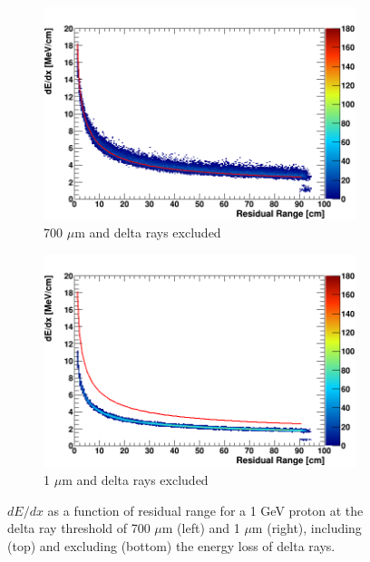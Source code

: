 \begin{figure}[t!]
\begin{subfigure}[b]{0.495\textwidth}
            \label{fig:derr_proton_delta_1}
        \end{subfigure}
        \begin{subfigure}[b]{0.495\textwidth}   
            \centering 
            \includegraphics[width=\textwidth]{derr_proton_only_700um}
            \caption{700 $\mu$m and delta rays excluded}%
            \label{fig:derr_proton_only_700}
        \end{subfigure}
        \hfill
        \begin{subfigure}[b]{0.495\textwidth}   
            \centering 
            \includegraphics[width=\textwidth]{derr_proton_only_1um}
            \caption{1 $\mu$m and delta rays excluded}%
            \label{fig:derr_proton_only_1}
        \end{subfigure}
	\caption[Energy-Residual Range of Protons at Different Delta Ray Thresholds]{
	$dE/dx$ as a function of residual range for a 1 GeV proton at the delta ray threshold of 700 $\mu$m (left) and 1 $\mu$m (right), including (top) and excluding (bottom) the energy loss of delta rays. 
	}
        \label{fig:proton_derr}
\end{figure}

